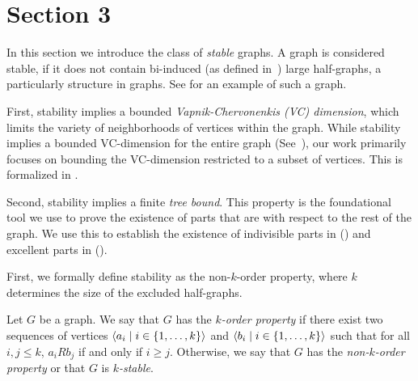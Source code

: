 \section{Section 3} \label{sec:section_3}

    In this section we introduce the class of \emph{stable} graphs.
    A graph is considered stable, if it does not contain bi-induced (as defined in~\cite{induced_subgraph_density_vi_bounded_vc_dimension})
    large half-graphs, a particularly \irregular{} structure in graphs.
    See  for an example of such a graph. 

    First, stability implies a bounded \emph{Vapnik-Chervonenkis (VC) dimension}, which limits the variety of
    neighborhoods of vertices within the graph.
    While stability implies a bounded VC-dimension for the entire graph
    (See~\cite{regularity_partitions_and_the_topology_of_graphons}), our work primarily focuses on bounding
    the VC-dimension restricted to a subset of vertices.
    This is formalized in .

    Second, stability implies a finite \emph{tree bound}.
    This property is the foundational tool we use to prove the existence of parts that are \regular
    with respect to the rest of the graph.
    We use this to establish the existence of indivisible parts in 
    () and
    excellent parts in  ().

    First, we formally define stability as the non-$k$-order property, where $k$ determines the size of the
    excluded half-graphs.

    \begin{definition} \label{def:k_order_property}
        Let $G$ be a graph.
        We say that $G$ has the \emph{$k$-order property} if there exist two sequences of vertices
        $\left< a_i \mid i \in \{ 1, \dots, k \} \right>$ and $\left< b_i \mid i \in \{ 1, \dots, k \} \right>$ such that
        for all $i,j \leq k$, $a_i R b_j$ if and only if $i \geq j$.
        Otherwise, we say that $G$ has the \emph{non-$k$-order property} or that $G$ is \emph{$k$-stable}.
    \end{definition}

